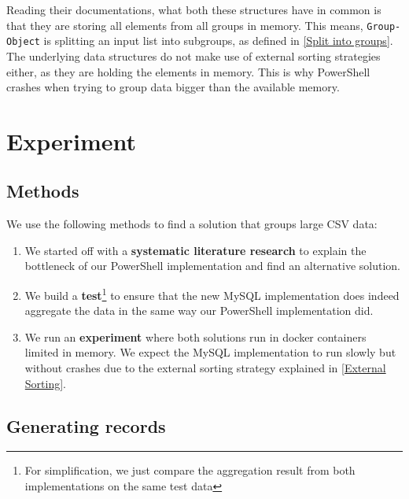 Reading their documentations, what both these structures have in common
is that they are storing all elements from all groups in memory. This means,
\verb+Group-Object+ is splitting an input list into subgroups,
as defined in \ref{Split into groups}. The underlying data structures
do not make use of external sorting strategies either, as they are
holding the elements in memory. This is why PowerShell crashes when
trying to group data bigger than the available memory.

\newpage

\section{Experiment}

\subsection{Methods}

We use the following methods to find a solution that groups large CSV data:

\begin{enumerate}
    \item We started off with a \textbf{systematic literature research}
        to explain the bottleneck of our PowerShell implementation
        and find an alternative solution.
    \item We build a \textbf{test}\footnote{For simplification,
        we just compare the aggregation result from both
        implementations on the same test data} to ensure that the new
        MySQL implementation does indeed aggregate the data in the same way
        our PowerShell implementation did.
    \item We run an \textbf{experiment} where both solutions run in
        docker containers limited in memory. We expect the MySQL implementation
        to run slowly but without crashes due to the external sorting
        strategy explained in \ref{External Sorting}.
\end{enumerate}

\subsection{Generating records} \label{Generating records}


